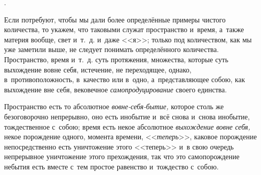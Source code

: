 \vspace{3mm}

.

Если потребуют, чтобы мы дали более определённые примеры чистого количества,
то укажем, что таковыми служат пространство и~время, а~также материя
вообще, свет и~т.~д. и~даже <<я>>; только под количеством, как мы уже
заметили выше, не следует понимать определённого количества. Пространство,
время и~т.~д. суть протяжения, множества, которые суть выхождение вовне себя,
истечение, не переходящее, однако, в~противоположность, в~качество или
в~одно, а~представляющее собою, как выхождение вне себя, вековечное
{\em самопродуцирование} своего единства.

Пространство есть то абсолютное {\em вовне-себя-бытие,} которое столь же
безоговорочно непрерывно, оно есть инобытие и~всё снова и~снова инобытие,
тождественное с~собою; время есть некое абсолютное {\em выхождение вовне себя,}
некое порождение одного, момента времени, <<{\em теперь}>>, каковое порождение
непосредственно есть уничтожение этого <<теперь>> и~в свою очередь непрерывное
уничтожение этого прехождения, так что это самопорождение небытия есть вместе
с~тем простое равенство и~тождество с~собою.


